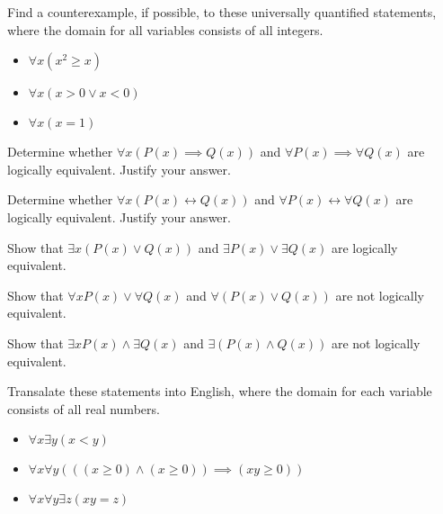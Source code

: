 \documentclass{article}
\newenvironment{problem}[2][Problem]{\begin{trivlist}
\item[\hskip \labelsep {\bfseries #1}\hskip \labelsep {\bfseries #2.}]}{\end{trivlist}}
\begin{document}
\begin{problem}{8}
Find a counterexample, if possible, to these universally quantified statements, where the domain for all variables consists of all integers.
\begin{itemize}
    \item[(a)] $\forall x (x^2 \geq x)$
    \item[(b)] $\forall x (x >0 \lor x<0)$
    \item[(c)] $\forall x ( x = 1) $
\end{itemize}
\end{problem}

\begin{problem}{9}
Determine whether $\forall x (P(x) \implies Q(x))$ and $\forall P(x) \implies \forall Q(x)$ are logically equivalent. Justify your answer.
\end{problem}

\begin{problem}{10}
Determine whether $\forall x (P(x) \leftrightarrow Q(x))$ and $\forall P(x) \leftrightarrow \forall Q(x)$ are logically equivalent. Justify your answer.
\end{problem}

\begin{problem}{11}
Show that  $\exists x (P(x) \lor Q(x))$ and $\exists P(x) \lor \exists Q(x)$ are logically equivalent.
\end{problem}

\begin{problem}{12}
Show that  $\forall x P(x) \lor \forall Q(x)$ and $\forall (P(x) \lor Q(x))$ are not logically equivalent.
\end{problem}

\begin{problem}{13}
Show that  $\exists x P(x) \land \exists Q(x)$ and $\exists (P(x) \land Q(x))$ are not logically equivalent.
\end{problem}

\begin{problem}{14}
Transalate these statements into English, where the domain for each variable consists of all real numbers.
\begin{itemize}
    \item[(a)] $\forall x \exists y (x < y) $
    \item[(b)] $\forall x \forall y (((x \geq 0) \land (x \geq 0) ) \implies (xy \geq 0)) $
    \item[(c)] $\forall x \forall y \exists z (xy=z) $
\end{itemize}
\end{problem}
\end{document}
